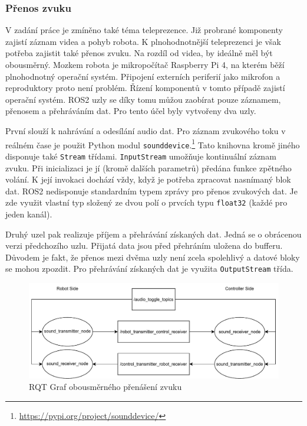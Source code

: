 \subsubsection*{Přenos zvuku}
V zadání práce je zmíněno také téma teleprezence. Již probrané komponenty zajistí záznam videa a pohyb robota. K plnohodnotnější teleprezenci je však potřeba zajistit také přenos zvuku. Na rozdíl od videa, by ideálně měl být obousměrný. Mozkem robota je mikropočítač Raspberry Pi 4, na kterém běží plnohodnotný operační systém. Připojení externích periferií jako mikrofon a reproduktory proto není problém. Řízení komponentů v tomto případě zajistí operační systém. ROS2 uzly se díky tomu můžou zaobírat pouze záznamem, přenosem a přehráváním dat. Pro tento účel byly vytvořeny dva uzly.

První slouží k nahrávání a odesílání audio dat. Pro záznam zvukového toku v reálném čase je použit Python modul \verb|sounddevice|.\footnote{\url{https://pypi.org/project/sounddevice/}} Tato knihovna kromě jiného disponuje také \verb|Stream| třídami. \verb|InputStream| umožňuje kontinuální záznam zvuku. Při inicializaci je jí (kromě dalších parametrů) předána funkce zpětného volání. K její invokaci dochází vždy, když je potřeba zpracovat nasnímaný blok dat. ROS2 nedisponuje standardním typem zprávy pro přenos zvukových dat. Je zde využit vlastní typ složený ze dvou polí o prvcích typu \verb|float32| (každé pro jeden kanál).

Druhý uzel pak realizuje příjem a přehrávání získaných dat. Jedná se o obrácenou verzi předchozího uzlu. Přijatá data jsou před přehráním uložena do bufferu. Důvodem je fakt, že přenos mezi dvěma uzly není zcela spolehlivý a datové bloky se mohou zpozdit. Pro přehrávání získaných dat je využita \verb|OutputStream| třída.

\begin{figure}[h!]
	\centering
	\includegraphics[scale=0.75]{obrazky-figures/audio_transfer_diagram.pdf}
	\caption{RQT Graf obousměrného přenášení zvuku}
	\label{fig:rqt_sound}
\end{figure}

